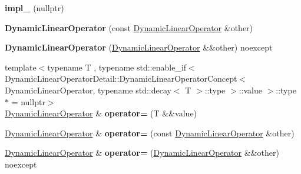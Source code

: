 \begin{DoxyCompactItemize}
\item 
\hypertarget{classSpacy_1_1DynamicLinearOperator_a11690defaf7620461f77f568ce397482}{{\bfseries impl\-\_\-} (nullptr)}\label{classSpacy_1_1DynamicLinearOperator_a11690defaf7620461f77f568ce397482}

\item 
\hypertarget{classSpacy_1_1DynamicLinearOperator_a390f4eea9c1e2e347349ea71409f3918}{{\bfseries \-Dynamic\-Linear\-Operator} (const \hyperlink{classSpacy_1_1DynamicLinearOperator}{\-Dynamic\-Linear\-Operator} \&other)}\label{classSpacy_1_1DynamicLinearOperator_a390f4eea9c1e2e347349ea71409f3918}

\item 
\hypertarget{classSpacy_1_1DynamicLinearOperator_a874aa65b502112eeb49e6b1a53504a00}{{\bfseries \-Dynamic\-Linear\-Operator} (\hyperlink{classSpacy_1_1DynamicLinearOperator}{\-Dynamic\-Linear\-Operator} \&\&other) noexcept}\label{classSpacy_1_1DynamicLinearOperator_a874aa65b502112eeb49e6b1a53504a00}

\item 
\hypertarget{classSpacy_1_1DynamicLinearOperator_ab3bf64c6af574e7bbf76ce1565c978b4}{{\footnotesize template$<$typename T , typename std\-::enable\-\_\-if$<$ Dynamic\-Linear\-Operator\-Detail\-::\-Dynamic\-Linear\-Operator\-Concept$<$ Dynamic\-Linear\-Operator, typename std\-::decay$<$ T $>$\-::type $>$\-::value $>$\-::type $\ast$  = nullptr$>$ }\\\hyperlink{classSpacy_1_1DynamicLinearOperator}{\-Dynamic\-Linear\-Operator} \& {\bfseries operator=} (\-T \&\&value)}\label{classSpacy_1_1DynamicLinearOperator_ab3bf64c6af574e7bbf76ce1565c978b4}

\item 
\hypertarget{classSpacy_1_1DynamicLinearOperator_a86fa1b52fd7806e186dd8e1808f89e00}{\hyperlink{classSpacy_1_1DynamicLinearOperator}{\-Dynamic\-Linear\-Operator} \& {\bfseries operator=} (const \hyperlink{classSpacy_1_1DynamicLinearOperator}{\-Dynamic\-Linear\-Operator} \&other)}\label{classSpacy_1_1DynamicLinearOperator_a86fa1b52fd7806e186dd8e1808f89e00}

\item 
\hypertarget{classSpacy_1_1DynamicLinearOperator_a4afea1ce038547a12dbbbccd259a8890}{\hyperlink{classSpacy_1_1DynamicLinearOperator}{\-Dynamic\-Linear\-Operator} \& {\bfseries operator=} (\hyperlink{classSpacy_1_1DynamicLinearOperator}{\-Dynamic\-Linear\-Operator} \&\&other) noexcept}\label{classSpacy_1_1DynamicLinearOperator_a4afea1ce038547a12dbbbccd259a8890}


\end{DoxyCompactItemize}
